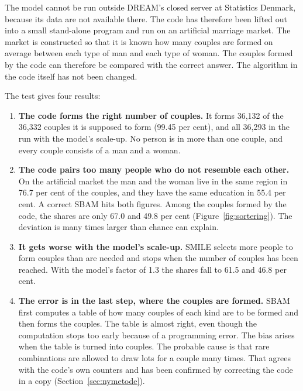 \documentclass[12pt,a4paper]{article}
\begin{document}
The model cannot be run outside DREAM's closed server at Statistics Denmark, because its data are
not available there. The code has therefore been lifted out into a small stand-alone program and run
on an artificial marriage market. The market is constructed so that it is known how many couples are
formed on average between each type of man and each type of woman. The couples formed by the code
can therefore be compared with the correct answer. The algorithm in the code itself has not been
changed.

The test gives four results:

\begin{enumerate}
\item \textbf{The code forms the right number of couples.} It forms 36,132 of the 36,332 couples it
is supposed to form (99.45 per cent), and all 36,293 in the run with the model's scale-up. No person
is in more than one couple, and every couple consists of a man and a woman.

\item \textbf{The code pairs too many people who do not resemble each other.} On the artificial
market the man and the woman live in the same region in 76.7 per cent of the couples, and they have
the same education in 55.4 per cent. A correct SBAM hits both figures. Among the couples formed by
the code, the shares are only 67.0 and 49.8 per cent (Figure~\ref{fig:sortering}). The deviation is
many times larger than chance can explain.

\item \textbf{It gets worse with the model's scale-up.} SMILE selects more people to form couples
than are needed and stops when the number of couples has been reached. With the model's factor of
1.3 the shares fall to 61.5 and 46.8 per cent.

\item \textbf{The error is in the last step, where the couples are formed.} SBAM first computes a
table of how many couples of each kind are to be formed and then forms the couples. The table is
almost right, even though the computation stops too early because of a programming error. The bias
arises when the table is turned into couples. The probable cause is that rare combinations are
allowed to draw lots for a couple many times. That agrees with the code's own counters and has been
confirmed by correcting the code in a copy (Section~\ref{sec:nymetode}).
\end{enumerate}
\end{document}
